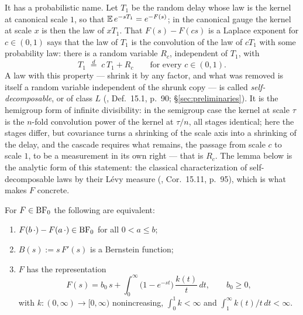 It has a probabilistic name. Let $T_1$ be the random delay whose law is the kernel at
canonical scale $1$, so that $\mathbb{E}\,e^{-sT_1} = e^{-F(s)}$; in the canonical gauge the kernel
at scale $x$ is then the law of $xT_1$. That $F(s) - F(cs)$ is a Laplace exponent for
$c \in (0,1)$ says that the law of $T_1$ is the convolution of the law of $cT_1$ with some
probability law: there is a random variable $R_c$, independent of $T_1$, with
\[
  T_1 \;\stackrel{d}{=}\; c\,T_1 + R_c \qquad \text{for every } c \in (0,1).
\]
A law with this property --- shrink it by any factor, and what was removed is itself a
random variable independent of the shrunk copy --- is called \emph{self-decomposable}, or of
class $L$ (, Def.~15.1, p.~90; \S\ref{sec:preliminaries}). It is the
hemigroup form of infinite divisibility: in the semigroup case the kernel at scale $\tau$ is
the $n$-fold convolution power of the kernel at $\tau/n$, all stages identical; here the
stages differ, but covariance turns a shrinking of the scale axis into a shrinking of the
delay, and the cascade requires what remains, the passage from scale $c$ to scale $1$, to be
a measurement in its own right --- that is $R_c$. The lemma below is the analytic form of
this statement: the classical characterization of self-decomposable laws by their Lévy
measure (, Cor.~15.11, p.~95), which is what makes $F$ concrete.

\begin{lemma}\label{lem:selfdecomposable-exponents}
For $F \in \mathrm{BF}_0$ the following are equivalent:
\begin{enumerate}
\item $F(b\,\cdot) - F(a\,\cdot) \in \mathrm{BF}_0$ for all $0 < a \le b$;
\item $B(s) := s\,F'(s)$ is a Bernstein function;
\item $F$ has the representation
\[
  F(s) = b_0\, s + \int_0^\infty \bigl(1 - e^{-st}\bigr)\, \frac{k(t)}{t}\,dt,
  \qquad b_0 \ge 0, \tag{7.1}
\]
with $k : (0,\infty) \to [0,\infty)$ nonincreasing, $\int_0^1 k < \infty$ and
$\int_1^\infty k(t)/t\,dt < \infty$.
\end{enumerate}
\end{lemma}

